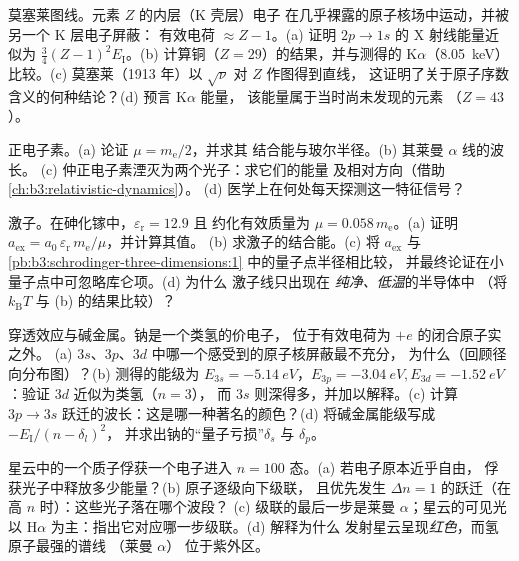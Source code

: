 \begin{exercise}[$\star\star$]\label{exo:b3:hydrogen-atom:5}
莫塞莱图线。元素 $Z$ 的内层（K 壳层）电子
在几乎裸露的原子核场中运动，并被另一个 K 层电子屏蔽：
有效电荷 $\approx Z - 1$。(a) 证明 $2p \to 1s$ 的
X 射线能量近似为 $\tfrac34(Z-1)^2E_{\text{I}}$。(b)
计算铜（$Z = 29$）的结果，并与测得的
K$\alpha$（\qty{8.05}{keV}）比较。(c) 莫塞莱（1913 年）以 $\sqrt{\nu}$ 对 $Z$ 作图得到直线，
这证明了关于原子序数含义的何种结论？(d) 预言 K$\alpha$ 能量，
该能量属于当时尚未发现的元素
（$Z = 43$）。
\end{exercise}

\begin{exercise}[$\star\star$]\label{exo:b3:hydrogen-atom:6}
正电子素。(a) 论证 $\mu = m_{\text{e}}/2$，并求其
结合能与玻尔半径。(b) 其莱曼 $\alpha$ 线的波长。
(c) 仲正电子素湮灭为两个光子：求它们的能量
及相对方向（借助\cref{ch:b3:relativistic-dynamics}）。
(d) 医学上在何处每天探测这一特征信号？
\end{exercise}

\begin{exercise}[$\star\star$]\label{exo:b3:hydrogen-atom:7}
激子。在砷化镓中，$\varepsilon_{\text{r}} = 12.9$ 且
约化有效质量为 $\mu = 0.058\,m_{\text{e}}$。(a) 证明
$a_{\text{ex}} = a_0\,\varepsilon_{\text{r}}\,m_{\text{e}}/\mu$，并计算其值。
(b) 求激子的结合能。(c) 将 $a_{\text{ex}}$ 与
\cref{pb:b3:schrodinger-three-dimensions:1} 中的量子点半径相比较，
并最终论证在小量子点中可忽略库仑项。(d) 为什么
激子线只出现在
\emph{纯净、低温}的半导体中
（将 $k_{\text{B}}T$ 与 (b) 的结果比较）？
\end{exercise}

\begin{exercise}[$\star\star$]\label{exo:b3:hydrogen-atom:8}
穿透效应与碱金属。钠是一个类氢的价电子，
位于有效电荷为 $+e$ 的闭合原子实之外。
(a) $3s$、$3p$、$3d$ 中哪一个感受到的原子核屏蔽最不充分，
为什么（回顾径向分布图）？(b) 测得的能级为
$E_{3s} = \qty{-5.14}{eV}$，$E_{3p} = \qty{-3.04}{eV},
E_{3d} = \qty{-1.52}{eV}$：验证 $3d$ 近似为类氢（$n = 3$），
而 $3s$ 则深得多，并加以解释。(c) 计算
$3p \to 3s$ 跃迁的波长：这是哪一种著名的颜色？(d) 将碱金属能级写成
$-E_{\text{I}}/(n - \delta_l)^2$，
并求出钠的“量子亏损”$\delta_s$ 与 $\delta_p$。
\end{exercise}

\begin{exercise}[$\star\star$]\label{exo:b3:hydrogen-atom:9}
星云中的一个质子俘获一个电子进入 $n = 100$ 态。(a) 若电子原本近乎自由，
俘获光子中释放多少能量？(b) 原子逐级向下级联，
且优先发生
$\Delta n = 1$ 的跃迁（在高 $n$ 时）：这些光子落在哪个波段？
(c) 级联的最后一步是莱曼 $\alpha$；星云的可见光
以 H$\alpha$ 为主：指出它对应哪一步级联。(d) 解释为什么
发射星云呈现\emph{红色}，而氢原子最强的谱线
（莱曼 $\alpha$）
位于紫外区。
\end{exercise}


